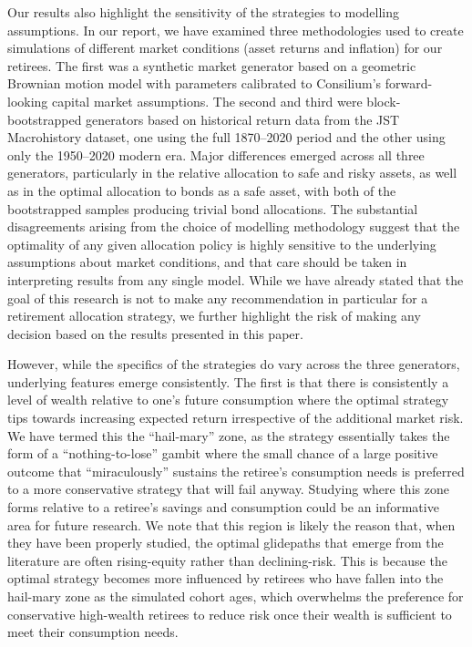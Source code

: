 \documentclass[11pt]{article}
\begin{document}
Our results also highlight the sensitivity of the strategies to modelling assumptions. In our report, we have examined three methodologies used to create simulations of different market conditions (asset returns and inflation) for our retirees. The first was a synthetic market generator based on a geometric Brownian motion model with parameters calibrated to Consilium's forward-looking capital market assumptions. The second and third were block-bootstrapped generators based on historical return data from the JST Macrohistory dataset, one using the full 1870--2020 period and the other using only the 1950--2020 modern era. Major differences emerged across all three generators, particularly in the relative allocation to safe and risky assets, as well as in the optimal allocation to bonds as a safe asset, with both of the bootstrapped samples producing trivial bond allocations. The substantial disagreements arising from the choice of modelling methodology suggest that the optimality of any given allocation policy is highly sensitive to the underlying assumptions about market conditions, and that care should be taken in interpreting results from any single model. While we have already stated that the goal of this research is not to make any recommendation in particular for a retirement allocation strategy, we further highlight the risk of making any decision based on the results presented in this paper. 

However, while the specifics of the strategies do vary across the three generators, underlying features emerge consistently. The first is that there is consistently a level of wealth relative to one's future consumption where the optimal strategy tips towards increasing expected return irrespective of the additional market risk. We have termed this the ``hail-mary'' zone, as the strategy essentially takes the form of a ``nothing-to-lose'' gambit where the small chance of a large positive outcome that ``miraculously'' sustains the retiree's consumption needs is preferred to a more conservative strategy that will fail anyway. Studying where this zone forms relative to a retiree's savings and consumption could be an informative area for future research. We note that this region is likely the reason that, when they have been properly studied, the optimal glidepaths that emerge from the literature are often rising-equity rather than declining-risk. This is because the optimal strategy becomes more influenced by retirees who have fallen into the hail-mary zone as the simulated cohort ages, which overwhelms the preference for conservative high-wealth retirees to reduce risk once their wealth is sufficient to meet their consumption needs.
\end{document}
